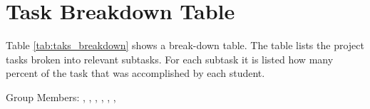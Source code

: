 \section{Task Breakdown Table \label{sec:tasks}}

Table \ref{tab:taks_breakdown} shows a break-down table. The table lists the project tasks broken into relevant subtasks. For each subtask it is listed how many percent of the task that was accomplished by each student.

\newpage 
Group Members: \authorOne, \authorTwo, \authorThree, \authorFour, \authorFive, \authorSix, \authorSeven

